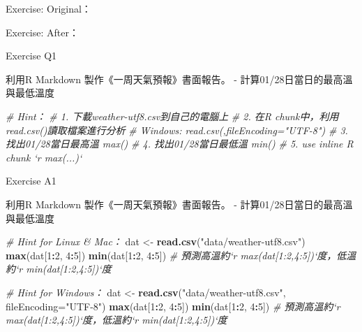 \documentclass[ignorenonframetext,]{beamer}
\newenvironment{Shaded}{\begin{snugshade}}{\end{snugshade}}
\newcommand{\KeywordTok}[1]{\textcolor[rgb]{0.13,0.29,0.53}{\textbf{#1}}}
\newcommand{\DataTypeTok}[1]{\textcolor[rgb]{0.13,0.29,0.53}{#1}}
\newcommand{\DecValTok}[1]{\textcolor[rgb]{0.00,0.00,0.81}{#1}}
\newcommand{\StringTok}[1]{\textcolor[rgb]{0.31,0.60,0.02}{#1}}
\newcommand{\CommentTok}[1]{\textcolor[rgb]{0.56,0.35,0.01}{\textit{#1}}}
\newcommand{\OperatorTok}[1]{\textcolor[rgb]{0.81,0.36,0.00}{\textbf{#1}}}
\newcommand{\NormalTok}[1]{#1}
\begin{document}
\begin{frame}{Exercise: Original：}

\end{frame}

\begin{frame}{Exercise: After：}

\end{frame}

\begin{frame}[fragile]{Exercise Q1}

利用R Markdown 製作《一周天氣預報》書面報告。 -
計算01/28日當日的最高溫與最低溫度

\begin{Shaded}
\begin{Highlighting}[]
\CommentTok{# Hint：}
\CommentTok{# 1. 下載weather-utf8.csv到自己的電腦上}
\CommentTok{# 2. 在R chunk中，利用read.csv()讀取檔案進行分析}
  \CommentTok{#  Windows: read.csv(,fileEncoding="UTF-8")}
\CommentTok{# 3. 找出01/28當日最高溫 max()}
\CommentTok{# 4. 找出01/28當日最低溫 min()}
\CommentTok{# 5. use inline R chunk `r max(...)` }
\end{Highlighting}
\end{Shaded}

\end{frame}

\begin{frame}[fragile]{Exercise A1}

利用R Markdown 製作《一周天氣預報》書面報告。 -
計算01/28日當日的最高溫與最低溫度

\begin{Shaded}
\begin{Highlighting}[]
\CommentTok{# Hint for Linux & Mac：}
\NormalTok{dat <-}\StringTok{ }\KeywordTok{read.csv}\NormalTok{(}\StringTok{"data/weather-utf8.csv"}\NormalTok{) }
\KeywordTok{max}\NormalTok{(dat[}\DecValTok{1}\OperatorTok{:}\DecValTok{2}\NormalTok{, }\DecValTok{4}\OperatorTok{:}\DecValTok{5}\NormalTok{])}
\KeywordTok{min}\NormalTok{(dat[}\DecValTok{1}\OperatorTok{:}\DecValTok{2}\NormalTok{, }\DecValTok{4}\OperatorTok{:}\DecValTok{5}\NormalTok{])}
\CommentTok{# 預測高溫約`r max(dat[1:2,4:5])`度，低溫約`r min(dat[1:2,4:5])`度}
\end{Highlighting}
\end{Shaded}

\begin{Shaded}
\begin{Highlighting}[]
\CommentTok{# Hint for Windows：}
\NormalTok{dat <-}\StringTok{ }\KeywordTok{read.csv}\NormalTok{(}\StringTok{"data/weather-utf8.csv"}\NormalTok{, }\DataTypeTok{fileEncoding=}\StringTok{"UTF-8"}\NormalTok{) }
\KeywordTok{max}\NormalTok{(dat[}\DecValTok{1}\OperatorTok{:}\DecValTok{2}\NormalTok{, }\DecValTok{4}\OperatorTok{:}\DecValTok{5}\NormalTok{])}
\KeywordTok{min}\NormalTok{(dat[}\DecValTok{1}\OperatorTok{:}\DecValTok{2}\NormalTok{, }\DecValTok{4}\OperatorTok{:}\DecValTok{5}\NormalTok{])}
\CommentTok{# 預測高溫約`r max(dat[1:2,4:5])`度，低溫約`r min(dat[1:2,4:5])`度}
\end{Highlighting}
\end{Shaded}

\end{frame}
\end{document}
